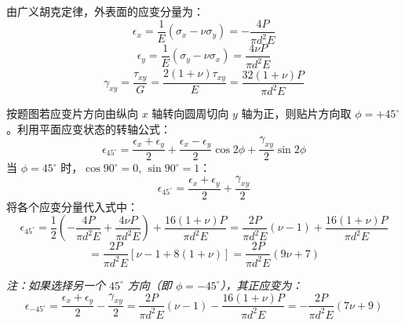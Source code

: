 \documentclass[11pt,a4paper]{ctexrep}
\begin{document}
{由广义胡克定律，外表面的应变分量为：
\[
\epsilon_x = \frac{1}{E} (\sigma_x - \nu \sigma_y) = -\frac{4P}{\pi d^2 E}
\]
\[
\epsilon_y = \frac{1}{E} (\sigma_y - \nu \sigma_x) = \frac{4\nu P}{\pi d^2 E}
\]
\[
\gamma_{xy} = \frac{\tau_{xy}}{G} = \frac{2(1+\nu)\tau_{xy}}{E} = \frac{32(1+\nu)P}{\pi d^2 E}
\]

按题图若应变片方向由纵向 $x$ 轴转向圆周切向 $y$ 轴为正，则贴片方向取 $\phi=+45^\circ$。利用平面应变状态的转轴公式：
\[
\epsilon_{45^\circ} = \frac{\epsilon_x + \epsilon_y}{2} + \frac{\epsilon_x - \epsilon_y}{2} \cos 2\phi + \frac{\gamma_{xy}}{2} \sin 2\phi
\]
当 $\phi = 45^\circ$ 时，$\cos 90^\circ = 0$, $\sin 90^\circ = 1$：
\[
\epsilon_{45^\circ} = \frac{\epsilon_x + \epsilon_y}{2} + \frac{\gamma_{xy}}{2}
\]
将各个应变分量代入式中：
\[
\epsilon_{45^\circ} = \frac{1}{2} \left( -\frac{4P}{\pi d^2 E} + \frac{4\nu P}{\pi d^2 E} \right) + \frac{16(1+\nu)P}{\pi d^2 E} = \frac{2P}{\pi d^2 E} (\nu - 1) + \frac{16(1+\nu)P}{\pi d^2 E}
\]
\[
= \frac{2P}{\pi d^2 E} \left[ \nu - 1 + 8(1 + \nu) \right] = \frac{2P}{\pi d^2 E} (9\nu + 7)
\]

\textit{注：如果选择另一个 $45^\circ$ 方向（即 $\phi = -45^\circ$），其正应变为：}
\[
\epsilon_{-45^\circ} = \frac{\epsilon_x + \epsilon_y}{2} - \frac{\gamma_{xy}}{2} = \frac{2P}{\pi d^2 E} (\nu - 1) - \frac{16(1+\nu)P}{\pi d^2 E} = -\frac{2P}{\pi d^2 E} (7\nu + 9)
\]


}
\end{document}
